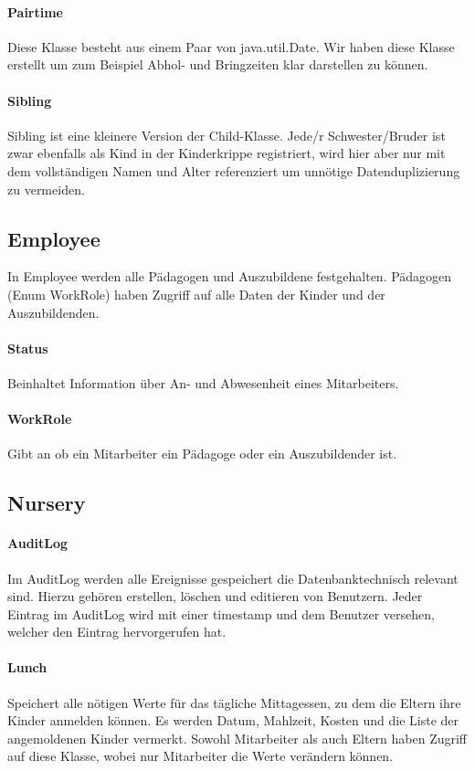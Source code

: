 \paragraph{Pairtime}
	Diese Klasse besteht aus einem Paar von java.util.Date. Wir haben diese Klasse erstellt um zum Beispiel Abhol- und Bringzeiten klar darstellen zu können. 
\paragraph{Sibling}
	Sibling ist eine kleinere Version der Child-Klasse. Jede/r Schwester/Bruder ist zwar ebenfalls als Kind in der Kinderkrippe registriert, wird hier aber nur mit dem vollständigen Namen und Alter referenziert um unnötige Datenduplizierung zu vermeiden. 

\subsection{Employee}
	In Employee werden alle Pädagogen und Auszubildene festgehalten. Pädagogen (Enum WorkRole) haben Zugriff auf alle Daten der Kinder und der Auszubildenden. 
\paragraph{Status}
	Beinhaltet Information über An- und Abwesenheit eines Mitarbeiters. 
\paragraph{WorkRole}
	Gibt an ob ein Mitarbeiter ein Pädagoge oder ein Auszubildender ist.
	
\subsection{Nursery}
\paragraph{AuditLog}
	Im AuditLog werden alle Ereignisse gespeichert die Datenbanktechnisch relevant sind. Hierzu gehören erstellen, löschen und editieren von Benutzern. Jeder Eintrag im AuditLog wird mit einer timestamp und dem Benutzer versehen, welcher den Eintrag hervorgerufen hat. 
\paragraph{Lunch}
	Speichert alle nötigen Werte für das tägliche Mittagessen, zu dem die Eltern ihre Kinder anmelden können. Es werden Datum, Mahlzeit, Kosten und die Liste der angemoldenen Kinder vermerkt. Sowohl Mitarbeiter als auch Eltern haben Zugriff auf diese Klasse, wobei nur Mitarbeiter die Werte verändern können.

